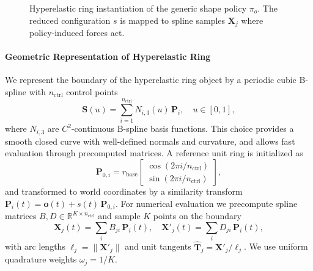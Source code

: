 \documentclass{article} %
\begin{document}
\begin{figure}[htbp]
\centering
{}
\caption{Hyperelastic ring instantiation of the generic shape policy $\pi_o$.
The reduced configuration $s$ is mapped to spline samples $\mathbf{X}_j$ where policy-induced forces act.}
\label{fig:hyperelastic_ring}
\end{figure}

\paragraph{Geometric Representation of Hyperelastic Ring}

We represent the boundary of the hyperelastic ring object by a periodic cubic B-spline with $n_{\text{ctrl}}$ control points
\begin{equation}
\mathbf{S}(u) = \sum_{i=1}^{n_{\text{ctrl}}} N_{i,3}(u)\,\mathbf{P}_i,
\quad u \in [0,1],
\end{equation}
where $N_{i,3}$ are $C^2$-continuous B-spline basis functions.
This choice provides a smooth closed curve with well-defined normals and curvature, and allows fast evaluation through precomputed matrices. A reference unit ring is initialized as
\begin{equation}
\mathbf{P}_{0,i} 
= r_{\text{base}}
\begin{bmatrix}
\cos(2\pi i/n_{\text{ctrl}}) \\
\sin(2\pi i/n_{\text{ctrl}})
\end{bmatrix},
\end{equation}
and transformed to world coordinates by a similarity transform
\(\mathbf{P}_i(t) = \mathbf{o}(t) + s(t)\,\mathbf{P}_{0,i}.\)
For numerical evaluation we precompute spline matrices $B,D\in\mathbb{R}^{K\times n_{\text{ctrl}}}$ and sample $K$ points on the boundary
\begin{equation}
\mathbf{X}_j(t) = \sum_{i} B_{ji}\,\mathbf{P}_i(t), 
\quad
\mathbf{X}'_j(t) = \sum_{i} D_{ji}\,\mathbf{P}_i(t),
\end{equation}
with arc lengths $\ell_j = \|\mathbf{X}'_j\|$ and unit tangents $\hat{\mathbf{T}}_j = \mathbf{X}'_j / \ell_j$.
We use uniform quadrature weights $\omega_j= 1/K$.
\end{document}
